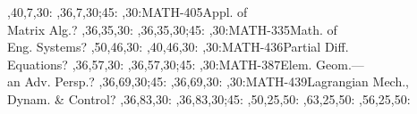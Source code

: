 \documentclass{article}
\begin{document}
\begin{chart}
  ,40,7,30:
  ,36,7,30;45:
,30:{MATH-405}{Appl. of\\Matrix Alg.}{?}
  ,36,35,30:
  ,36,35,30;45:
,30:{MATH-335}{Math. of\\Eng. Systems}{?}
  ,50,46,30:
  ,40,46,30:
,30:{MATH-436}{Partial Diff.\\Equations}{?}
  ,36,57,30:
  ,36,57,30;45:
,30:{MATH-387}{Elem. Geom.---\\an Adv. Persp.}{?}
  ,36,69,30;45:
  ,36,69,30:
,30:{MATH-439}{Lagrangian Mech.,\\Dynam. \& Control}{?}
  ,36,83,30:
  ,36,83,30;45:
  ,50,25,50:
  ,63,25,50:
  ,56,25,50:
\end{chart}
\end{document}

